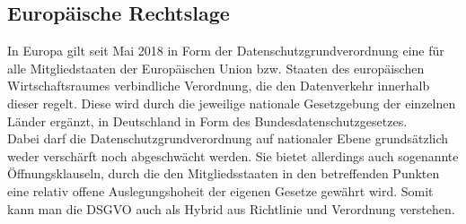 \subsection{Europäische Rechtslage}
    In Europa gilt seit Mai 2018 in Form der \glqq Datenschutzgrundverordnung\grqq{} eine für alle Mitgliedstaaten der Europäischen Union bzw. Staaten des europäischen Wirtschaftsraumes verbindliche Verordnung, die den Datenverkehr innerhalb dieser regelt. Diese wird durch die jeweilige nationale Gesetzgebung der einzelnen Länder ergänzt, in Deutschland in Form des Bundesdatenschutzgesetzes.\\
    Dabei darf die Datenschutzgrundverordnung auf nationaler Ebene grundsätzlich weder verschärft noch abgeschwächt werden. Sie bietet allerdings auch sogenannte Öffnungsklauseln, durch die den Mitgliedsstaaten in den betreffenden Punkten eine relativ offene Auslegungshoheit der eigenen Gesetze gewährt wird. Somit kann man die DSGVO auch als Hybrid aus Richtlinie und Verordnung verstehen.


